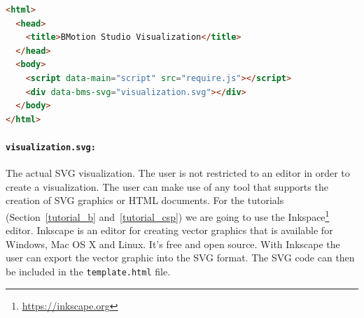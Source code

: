 \begin{lstlisting}[language=html]
<html>
  <head>
    <title>BMotion Studio Visualization</title>
  </head>
  <body>
    <script data-main="script" src="require.js"></script>
    <div data-bms-svg="visualization.svg"></div>
  </body>
</html>
\end{lstlisting}


\paragraph{\texttt{visualization.svg:}}


The actual SVG visualization.
The user is not restricted to an editor in order to create a visualization.
The user can make use of any tool that supports the creation of SVG graphics or HTML documents.
For the tutorials (Section~\ref{tutorial_b} and~\ref{tutorial_csp}) we are going to use the Inkspace\footnote{\url{https://inkscape.org}} editor. Inkscape is an editor for creating vector graphics that is available for Windows, Mac OS X and Linux.
It's free and open source.
With Inkscape the user can export the vector graphic into the SVG format.
The SVG code can then be included in the \texttt{template.html} file.

